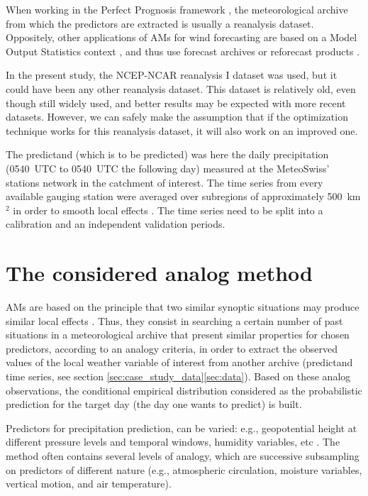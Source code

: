 \documentclass{ametsoc}
\begin{document}
When working in the Perfect Prognosis framework \citep{Klein1963}, the meteorological archive from which the predictors are extracted is usually a reanalysis dataset. Oppositely, other applications of AMs for wind forecasting are based on a Model Output Statistics context \citep[MOS, see][]{Glahn1972}, and thus use forecast archives or reforecast products \citep[e.g.,][]{DelleMonache2013, DelleMonache2011, Alessandrini2015, Junk2015, Junk2015c}.

In the present study, the NCEP-NCAR reanalysis I dataset \citep[6-hourly, 17 pressure levels at a resolution of 2.5\degree, see][]{Kalnay1996} was used, but it could have been any other reanalysis dataset. This dataset is relatively old, even though still widely used, and better results may be expected with more recent datasets. However, we can safely make the assumption that if the optimization technique works for this reanalysis dataset, it will also work on an improved one.

The predictand (which is to be predicted) was here the daily precipitation (0540~UTC to 0540~UTC the following day) measured at the MeteoSwiss' stations network in the catchment of interest. The time series from every available gauging station were averaged over subregions of approximately 500~km$^{2}$ \citep[see][for the details]{Horton2012a} in order to smooth local effects \citep{Obled2002, Marty2012}. The time series need to be split into a calibration and an independent validation periods.


\section{The considered analog method}
\label{sec:am}

AMs are based on the principle that two similar synoptic situations may produce similar local effects \citep{Lorenz1956, Lorenz1969}. Thus, they consist in searching a certain number of past situations in a meteorological archive that present similar properties for chosen predictors, according to an analogy criteria, in order to extract the observed values of the local weather variable of interest from another archive (predictand time series, see section \ref{sec:case_study_data}\ref{sec:data}). Based on these analog observations, the conditional empirical distribution considered as the probabilistic prediction for the target day (the day one wants to predict) is built.

Predictors for precipitation prediction, can be varied: e.g., geopotential height at different pressure levels and temporal windows, humidity variables, etc \citep[see][for a more detailed list of predictors]{BenDaoud2016}. The method often contains several levels of analogy, which are successive subsampling on predictors of different nature (e.g., atmospheric circulation, moisture variables, vertical motion, and air temperature). 
\end{document}
